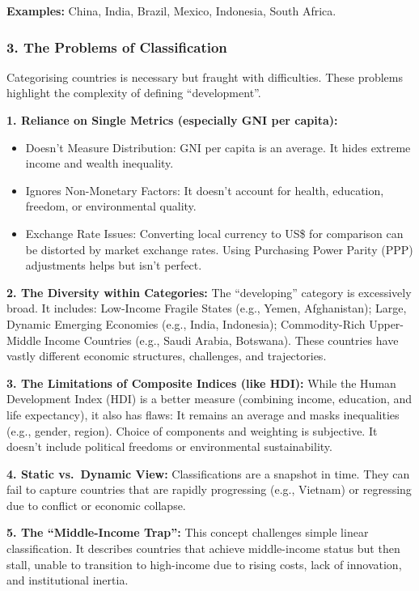 \documentclass[11pt, a4paper, twoside]{book}
\begin{document}
\textbf{Examples:} China, India, Brazil, Mexico, Indonesia, South Africa.

\subsubsection{3. The Problems of Classification}

Categorising countries is necessary but fraught with difficulties. These problems highlight the complexity of defining ``development''.

\textbf{1. Reliance on Single Metrics (especially GNI per capita):}
\begin{itemize}
  \item Doesn't Measure Distribution: GNI per capita is an average. It hides extreme income and wealth inequality.
  \item Ignores Non-Monetary Factors: It doesn't account for health, education, freedom, or environmental quality.
  \item Exchange Rate Issues: Converting local currency to US\$ for comparison can be distorted by market exchange rates. Using Purchasing Power Parity (PPP) adjustments helps but isn't perfect.
\end{itemize}

\textbf{2. The Diversity within Categories:} The ``developing'' category is excessively broad. It includes: Low-Income Fragile States (e.g., Yemen, Afghanistan); Large, Dynamic Emerging Economies (e.g., India, Indonesia); Commodity-Rich Upper-Middle Income Countries (e.g., Saudi Arabia, Botswana). These countries have vastly different economic structures, challenges, and trajectories.

\textbf{3. The Limitations of Composite Indices (like HDI):} While the Human Development Index (HDI) is a better measure (combining income, education, and life expectancy), it also has flaws: It remains an average and masks inequalities (e.g., gender, region). Choice of components and weighting is subjective. It doesn't include political freedoms or environmental sustainability.

\textbf{4. Static vs.\ Dynamic View:} Classifications are a snapshot in time. They can fail to capture countries that are rapidly progressing (e.g., Vietnam) or regressing due to conflict or economic collapse.

\textbf{5. The ``Middle-Income Trap'':} This concept challenges simple linear classification. It describes countries that achieve middle-income status but then stall, unable to transition to high-income due to rising costs, lack of innovation, and institutional inertia.
\end{document}
